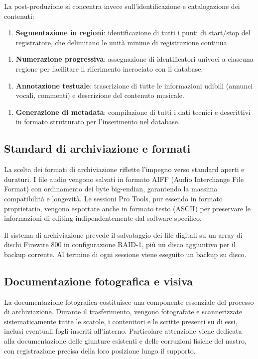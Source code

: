 La post-produzione si concentra invece sull'identificazione e catalogazione dei contenuti:

\begin{enumerate}
    \item \textbf{Segmentazione in regioni}: identificazione di tutti i punti di start/stop del registratore, che delimitano le unità minime di registrazione continua.
\end{enumerate}

\begin{enumerate}
    \item \textbf{Numerazione progressiva}: assegnazione di identificatori univoci a ciascuna regione per facilitare il riferimento incrociato con il database.
\end{enumerate}

\begin{enumerate}
    \item \textbf{Annotazione testuale}: trascrizione di tutte le informazioni udibili (annunci vocali, commenti) e descrizione del contenuto musicale.
\end{enumerate}

\begin{enumerate}
    \item \textbf{Generazione di metadata}: compilazione di tutti i dati tecnici e descrittivi in formato strutturato per l'inserimento nel database.
\end{enumerate}
\subsection{Standard di archiviazione e formati}
La scelta dei formati di archiviazione riflette l'impegno verso standard aperti e duraturi. I file audio vengono salvati in formato AIFF (Audio Interchange File Format) con ordinamento dei byte big-endian, garantendo la massima compatibilità e longevità\cite[p. 174]{pro:beracpmm4ch2011}. Le sessioni Pro Tools, pur essendo in formato proprietario, vengono esportate anche in formato testo (ASCII) per preservare le informazioni di editing indipendentemente dal software specifico.

Il sistema di archiviazione prevede il salvataggio dei file digitali su un array di dischi Firewire 800 in configurazione RAID-1, più un disco aggiuntivo per il backup corrente. Al termine di ogni sessione viene eseguito un backup su disco.
\subsection{Documentazione fotografica e visiva}
La documentazione fotografica costituisce una componente essenziale del processo di archiviazione. Durante il trasferimento, vengono fotografate e scannerizzate sistematicamente tutte le scatole, i contenitori e le scritte presenti su di essi, inclusi eventuali fogli inseriti all'interno. Particolare attenzione viene dedicata alla documentazione delle giunture esistenti e delle corruzioni fisiche del nastro, con registrazione precisa della loro posizione lungo il supporto\cite[p. 172]{pro:scelsitapes2007}. 

